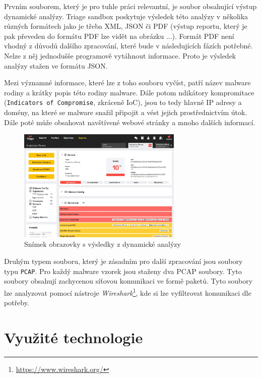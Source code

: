 Prvním souborem, který je pro tuhle práci relevantní, je soubor obsahující výstup dynamické analýzy. Triage sandbox poskytuje výsledek této analýzy v několika různých formátech jako je třeba XML, JSON či PDF (výstup reportu, který je pak převeden do formátu PDF lze vidět na obrázku ...).
Formát PDF není vhodný z důvodů dalšího zpracování, které bude v následujících fázích potřebné. Nelze z něj jednodušše programově vytáhnout informace. Proto je výsledek analýzy stažen ve formátu JSON.

Mezi významné informace, které lze z toho souboru vyčíst, patří název malware rodiny a krátky popis této rodiny malware. Dále potom ndikátory kompromitace (\texttt{Indicators of Compromise}, zkráceně IoC), 
jsou to tedy hlavně IP adresy a domény, na které se malware snažil připojit a vést jejich prostřednictvím útok. Dále poté může obsahovat navštívené webové stránky a mnoho dalších informací.

\begin{figure}[h]
	\centering
        \includegraphics[width=0.7\textwidth]{obrazky/3-triage-report.png}
	\caption{Snímek obrazovky s výsledky z dynamické analýzy}
    \label{Report_image}
\end{figure}

Druhým typem souboru, který je zásadním pro další zpracování jsou soubory typu \texttt{PCAP}. Pro každý malware vzorek jsou staženy dva PCAP soubory.
Tyto soubory obsahují zachycenou síťovou komunikaci ve formě paketů. Tyto soubory lze analyzovat pomocí nástroje \textit{Wireshark}\footnote{\href{https://www.wireshark.org/}{https://www.wireshark.org/}}, 
kde si lze vyfiltrovat komunikaci dle potřeby.

\newpage
\section{Využité technologie}

